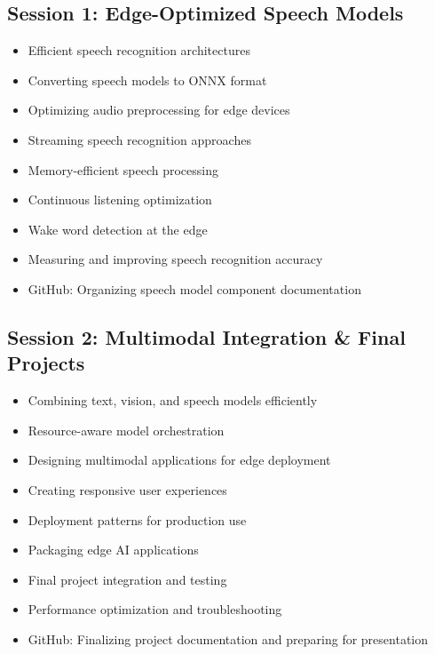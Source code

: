 \documentclass[11pt]{article}
\begin{document}
	\subsection{Session 1: Edge-Optimized Speech Models}
	\label{subsec:week5-session1}
	\begin{itemize}
		\item Efficient speech recognition architectures
		\item Converting speech models to ONNX format
		\item Optimizing audio preprocessing for edge devices
		\item Streaming speech recognition approaches
		\item Memory-efficient speech processing
		\item Continuous listening optimization
		\item Wake word detection at the edge
		\item Measuring and improving speech recognition accuracy
		\item GitHub: Organizing speech model component documentation
	\end{itemize}
	
	\begin{center}
	\end{center}
	
	\subsection{Session 2: Multimodal Integration \& Final Projects}
	\label{subsec:week5-session2}
	\begin{itemize}
		\item Combining text, vision, and speech models efficiently
		\item Resource-aware model orchestration
		\item Designing multimodal applications for edge deployment
		\item Creating responsive user experiences
		\item Deployment patterns for production use
		\item Packaging edge AI applications
		\item Final project integration and testing
		\item Performance optimization and troubleshooting
		\item GitHub: Finalizing project documentation and preparing for presentation
	\end{itemize}
	
\end{document}
